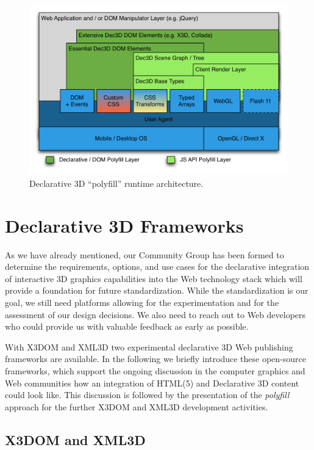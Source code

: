 \documentclass[review]{acmsiggraph}
\begin{document}
\begin{figure}
  \centering
  \includegraphics[width=1.0\columnwidth]{images/Dec3D-Architecture.png}
  \caption{Declarative 3D ``polyfill'' runtime architecture.}
  \label{fig:polyArch}
\end{figure}


\section{Declarative 3D Frameworks}
\label{sec:Frameworks}

As we have already mentioned, our Community Group has been formed to determine the requirements, options, and use cases for the declarative integration of interactive 3D graphics capabilities into the Web technology stack which will provide a foundation for future standardization.
While the standardization is our goal, we still need platforms allowing for the experimentation and for the assessment of our design decisions. We also need to reach out to Web developers who could provide us with valuable feedback as early as possible.

With X3DOM \cite{Behr2009} and XML3D \cite{Sons2010} two experimental declarative 3D Web publishing frameworks are available. In the following we briefly introduce these open-source frameworks, which support the ongoing discussion in the computer graphics and Web communities how an integration of HTML(5) and Declarative 3D content could look like. This discussion is followed by the presentation of the \textit{polyfill} approach for the further X3DOM and XML3D development activities.


\subsection{X3DOM and XML3D}
\end{document}
